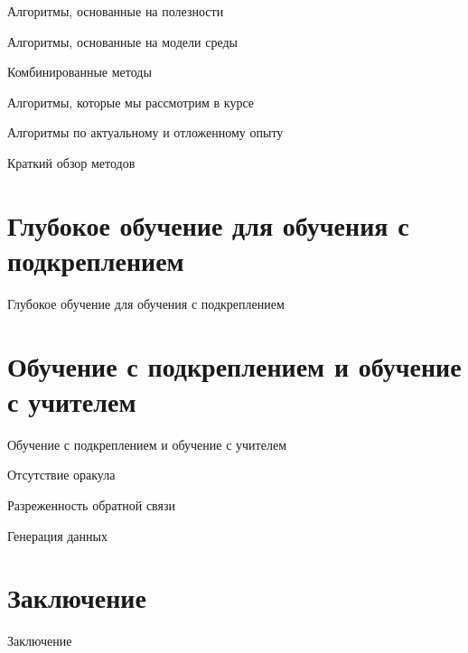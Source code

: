\documentclass[10pt,aspectratio=169]{beamer}
\begin{document}
\begin{frame}{Алгоритмы, основанные на полезности}
	
\end{frame}

\begin{frame}{Алгоритмы, основанные на модели среды}
	
\end{frame}

\begin{frame}{Комбинированные методы}
	
\end{frame}

\begin{frame}{Алгоритмы, которые мы рассмотрим в курсе}
	
\end{frame}

\begin{frame}{Алгоритмы по актуальному и отложенному опыту}
	
\end{frame}

\begin{frame}{Краткий обзор методов}
	
\end{frame}

\section{Глубокое обучение для обучения с подкреплением}

\begin{frame}{Глубокое обучение для обучения с подкреплением}
	
\end{frame}

\section{Обучение с подкреплением и обучение с учителем}

\begin{frame}{Обучение с подкреплением и обучение с учителем}
	
\end{frame}

\begin{frame}{Отсутствие оракула}
	
\end{frame}

\begin{frame}{Разреженность обратной связи}
	
\end{frame}

\begin{frame}{Генерация данных}
	
\end{frame}

\section{Заключение}

\begin{frame}{Заключение}
	
\end{frame}




\backmatter
\end{document}
